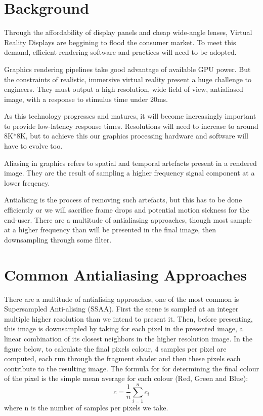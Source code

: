 \documentclass[12pt,a4paper,twoside,openright]{report}
\begin{document}
\section{Background}

Through the affordability of display panels and cheap wide-angle lenses, Virtual Reality Displays are beggining to flood the consumer market. To meet this demand, efficient rendering software and practices will need to be adopted.

Graphics rendering pipelines take good advantage of available GPU power. But the constraints of realistic, immersive virtual reality present a huge challenge to engineers. They must output a high resolution, wide field of view, antialiased image, with a response to stimulus time under 20ms.

As this technology progresses and matures, it will become increasingly important to provide low-latency response times. Resolutions will need to increase to around 8K*8K, but to achieve this our graphics processing hardware and software will have to evolve too.

Aliasing in graphics refers to spatial and temporal artefacts present in a rendered image. They are the result of sampling a higher frequency signal component at a lower freqency.

Antialising is the process of removing such artefacts, but this has to be done efficiently or we will sacrifice frame drops and potential motion sickness for the end-user.
There are a multitude of antialiasing approaches, though most sample at a higher frequency than will be presented in the final image, then downsampling through some filter. 

\section{Common Antialiasing Approaches}

There are a multitude of antialising approaches, one of the most common is Supersampled Anti-alising (SSAA).
First the scene is sampled at an integer multiple higher resolution than we intend to present it.
Then, before presenting, this image is downsampled by taking for each pixel in the presented image, a linear combination of its closest neighbors in the higher resolution image. In the figure below, to calculate the final pixels colour, 4 samples per pixel are computed, each run through the fragment shader and then these pixels each contribute to the resulting image. The formula for for determining the final colour of the pixel is the simple mean average for each colour (Red, Green and Blue):
$$ c = \frac{1}{n}\displaystyle\sum_{i=1}^n c_i $$ where n is the number of samples per pixels we take.
\end{document}
